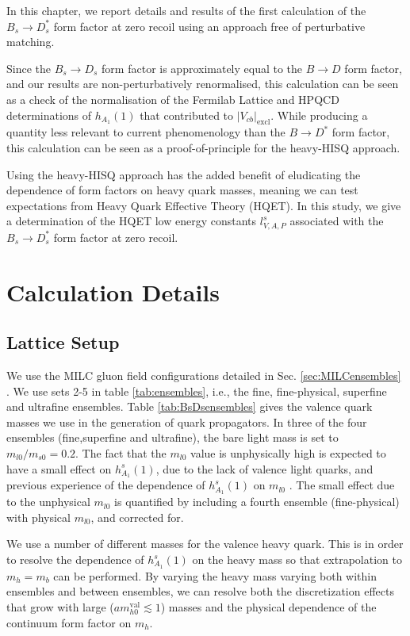 In this chapter, we report details and results of the first calculation of the $B_s\to D^*_s$ form factor at zero recoil using an approach free of perturbative matching. 

Since the $B_s\to D_s$ form factor is approximately equal to the $B\to D$ form factor, and our results are non-perturbatively renormalised, this calculation can be seen as a check of the normalisation of the Fermilab Lattice and HPQCD determinations of $h_{A_1}(1)$ that contributed to $|V_{cb}|_{\text{excl}}$. While producing a quantity less relevant to current phenomenology than the $B\to D^*$ form factor, this calculation can be seen as a proof-of-principle for the heavy-HISQ approach. 

Using the heavy-HISQ approach has the added benefit of eludicating the dependence of form factors on heavy quark masses, meaning we can test expectations from Heavy Quark Effective Theory (HQET). In this study, we give a determination of the HQET low energy constants $l_{V,A,P}^s$ associated with the $B_s \to D_s^*$ form factor at zero recoil.

\section{Calculation Details}
\label{sec:BsDsstar_deets}

\subsection{Lattice Setup}

We use the MILC gluon field configurations detailed in Sec. \ref{sec:MILCensembles} \cite{Bazavov:2010ru,Bazavov:2012xda}. We use sets 2-5 in table \ref{tab:ensembles}, i.e., the fine, fine-physical, superfine and ultrafine ensembles. Table \ref{tab:BsDsensembles} gives the valence quark masses we use in the generation of quark propagators. In three of the four ensembles (fine,superfine and ultrafine), the bare light mass is set to $m_{l0}/m_{s0} = 0.2$. The fact that the $m_{l0}$ value is unphysically high is expected to have a small effect on $h^s_{A_1}(1)$, due to the lack of valence light quarks, and previous experience of the dependence of $h_{A_1}^s(1)$ on $m_{l0}$ \cite{Harrison:2017fmw}. The small effect due to the unphysical $m_{l0}$ is quantified by including a fourth ensemble (fine-physical) with physical $m_{l0}$, and corrected for.

We use a number of different masses for the valence heavy quark. This is in order to resolve the dependence of $h_{A_1}^s(1)$ on the heavy mass so that extrapolation to $m_h=m_b$ can be performed. By varying the heavy mass varying both within ensembles and between ensembles, we can resolve both the discretization effects that grow with large ($am^{\text{val}}_{h0} \lesssim 1$) masses and the physical dependence of the continuum form factor on $m_h$.

